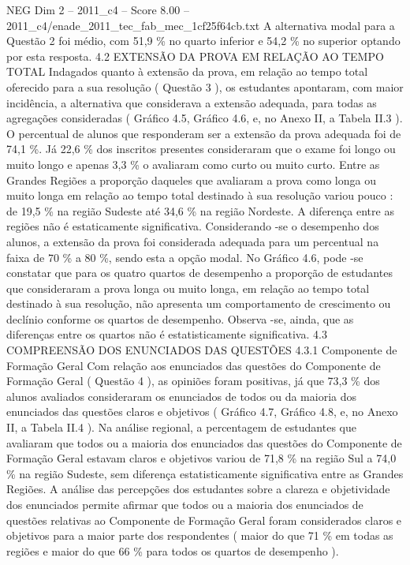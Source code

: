 \begin{textsample}{NEG Dim 2 – 2011\_c4 – Score 8.00 – 2011\_c4/enade\_2011\_tec\_fab\_mec\_1cf25f64cb.txt}
A alternativa modal para a Questão 2 foi médio, com 51,9 \% no quarto inferior e 54,2 \% no superior optando por esta resposta. 4.2 EXTENSÃO DA PROVA EM RELAÇÃO AO TEMPO TOTAL Indagados quanto à extensão da prova, em relação ao tempo total oferecido para a sua resolução ( Questão 3 ), os estudantes apontaram, com maior incidência, a alternativa que considerava a extensão adequada, para todas as agregações consideradas ( Gráfico 4.5, Gráfico 4.6, e, no Anexo II, a Tabela II.3 ).
O percentual de alunos que responderam ser a extensão da prova adequada foi de 74,1 \%.
Já 22,6 \% dos inscritos presentes consideraram que o exame foi longo ou muito longo e apenas 3,3 \% o avaliaram como curto ou muito curto.
Entre as Grandes Regiões a proporção daqueles que avaliaram a prova como longa ou muito longa em relação ao tempo total destinado à sua resolução variou pouco : de 19,5 \% na região Sudeste até 34,6 \% na região Nordeste.
A diferença entre as regiões não é estaticamente significativa.
Considerando -se o desempenho dos alunos, a extensão da prova foi considerada adequada para um percentual na faixa de 70 \% a 80 \%, sendo esta a opção modal.
No Gráfico 4.6, pode -se constatar que para os quatro quartos de desempenho a proporção de estudantes que consideraram a prova longa ou muito longa, em relação ao tempo total destinado à sua resolução, não apresenta um comportamento de crescimento ou declínio conforme os quartos de desempenho.
Observa -se, ainda, que as diferenças entre os quartos não é estatisticamente significativa. 4.3 COMPREENSÃO DOS ENUNCIADOS DAS QUESTÕES 4.3.1 Componente de Formação Geral Com relação aos enunciados das questões do Componente de Formação Geral ( Questão 4 ), as opiniões foram positivas, já que 73,3 \% dos alunos avaliados consideraram os enunciados de todos ou da maioria dos enunciados das questões claros e objetivos ( Gráfico 4.7, Gráfico 4.8, e, no Anexo II, a Tabela II.4 ).
Na análise regional, a percentagem de estudantes que avaliaram que todos ou a maioria dos enunciados das questões do Componente de Formação Geral estavam claros e objetivos variou de 71,8 \% na região Sul a 74,0 \% na região Sudeste, sem diferença estatisticamente significativa entre as Grandes Regiões.
A análise das percepções dos estudantes sobre a clareza e objetividade dos enunciados permite afirmar que todos ou a maioria dos enunciados de questões relativas ao Componente de Formação Geral foram considerados claros e objetivos para a maior parte dos respondentes ( maior do que 71 \% em todas as regiões e maior do que 66 \% para todos os quartos de desempenho ).

\end{textsample}
